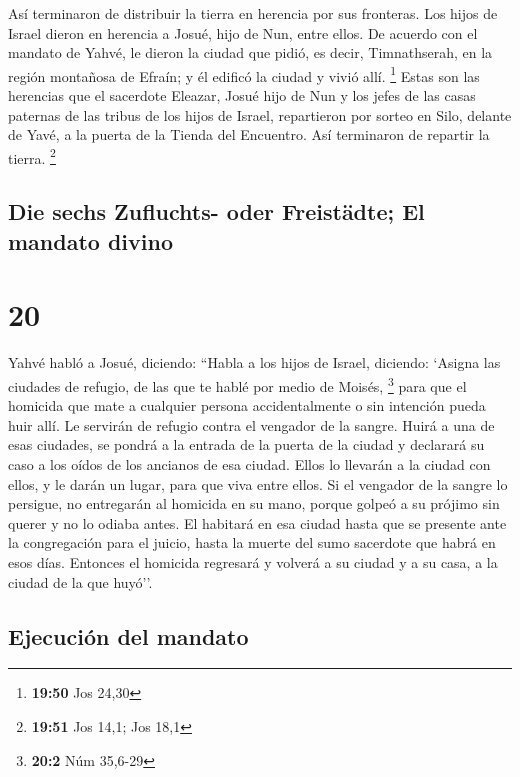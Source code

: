  Así terminaron de distribuir la tierra en herencia por
sus fronteras. Los hijos de Israel dieron en herencia a Josué, hijo de
Nun, entre ellos.  De acuerdo con el mandato de Yahvé, le
dieron la ciudad que pidió, es decir, Timnathserah, en la región
montañosa de Efraín; y él edificó la ciudad y vivió allí. \footnote{\textbf{19:50}
  Jos 24,30}  Estas son las herencias que el sacerdote
Eleazar, Josué hijo de Nun y los jefes de las casas paternas de las
tribus de los hijos de Israel, repartieron por sorteo en Silo, delante
de Yavé, a la puerta de la Tienda del Encuentro. Así terminaron de
repartir la tierra. \footnote{\textbf{19:51} Jos 14,1; Jos 18,1}

\hypertarget{die-sechs-zufluchts--oder-freistuxe4dte-el-mandato-divino}{%
\subsection{Die sechs Zufluchts- oder Freistädte; El mandato
divino}\label{die-sechs-zufluchts--oder-freistuxe4dte-el-mandato-divino}}

\hypertarget{section-19}{%
\section{20}\label{section-19}}

 Yahvé habló a Josué, diciendo:  ``Habla a
los hijos de Israel, diciendo: `Asigna las ciudades de refugio, de las
que te hablé por medio de Moisés, \footnote{\textbf{20:2} Núm 35,6-29}
 para que el homicida que mate a cualquier persona
accidentalmente o sin intención pueda huir allí. Le servirán de refugio
contra el vengador de la sangre.  Huirá a una de esas
ciudades, se pondrá a la entrada de la puerta de la ciudad y declarará
su caso a los oídos de los ancianos de esa ciudad. Ellos lo llevarán a
la ciudad con ellos, y le darán un lugar, para que viva entre ellos.
 Si el vengador de la sangre lo persigue, no entregarán al
homicida en su mano, porque golpeó a su prójimo sin querer y no lo
odiaba antes.  El habitará en esa ciudad hasta que se
presente ante la congregación para el juicio, hasta la muerte del sumo
sacerdote que habrá en esos días. Entonces el homicida regresará y
volverá a su ciudad y a su casa, a la ciudad de la que huyó''.

\hypertarget{ejecuciuxf3n-del-mandato}{%
\subsection{Ejecución del mandato}\label{ejecuciuxf3n-del-mandato}}

